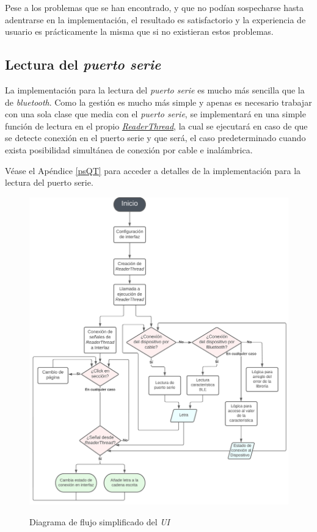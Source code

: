 Pese a los problemas que se han encontrado, y que no podían sospecharse
hasta adentrarse en la implementación, el resultado es satisfactorio
y la experiencia de usuario es prácticamente la misma que si no
existieran estos problemas.


\subsection{Lectura del \textit{puerto serie}}
La implementación para la lectura del \textit{puerto serie} es mucho más sencilla
que la de \textit{bluetooth}. Como la gestión es mucho más simple
y apenas es necesario trabajar con una sola clase que media con el
\textit{puerto serie}, se implementará en una simple función de lectura
en el propio
\href{https://github.com/AntonioPriego/SmartPen/blob/main/SmartPenUI/readerthread.cpp}{\textit{ReaderThread}},
la cual se ejecutará en caso de que
se detecte conexión en el puerto serie y que será, el caso predeterminado
cuando exista posibilidad simultánea de conexión por cable e inalámbrica.

Véase el Apéndice \ref{psQT} para acceder a detalles de la implementación
para la lectura del puerto serie.

\begin{figure}[h]
    \centering
    \includegraphics[width=1\textwidth]{capturas/DiagramaFlujoUI.png}\\[-0,20cm]
    \caption{Diagrama de flujo simplificado del \textit{UI}\label{diagFlujoQT}}
\end{figure}